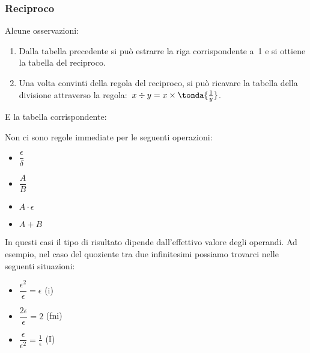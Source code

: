 \subsubsection{Reciproco}
\label{subsec:insnum_reciproco}

\noindent \begin{minipage}{.5\textwidth}
Alcune osservazioni:
\begin{enumerate} [noitemsep]
 \item Dalla tabella precedente si può estrarre la riga corrispondente a~1
e si ottiene la tabella del reciproco.
 \item Una volta convinti della regola del reciproco, si può ricavare la 
tabella della divisione attraverso la 
regola:~$x \div y = x \times \tonda{\frac{1}{y}}$.
\end{enumerate}
\end{minipage}
\hfill
\begin{minipage}{.45\textwidth}
E la tabella corrispondente:
\begin{center}
\renewcommand{\arraystretch}{.0}
\end{center}
\vspace{11mm}
\end{minipage}

\begin{osservazione}
Non ci sono regole immediate per le seguenti operazioni:
\begin{multicols}{4}
\begin{itemize} [nosep]
 \item \(\dfrac{\epsilon}{\delta}\)
 \item \(\dfrac{A}{B}\)
 \item \(A \cdot \epsilon\)
 \item \(A + B\)
\end{itemize}
\end{multicols}
In questi casi il tipo di risultato dipende dall'effettivo valore degli 
operandi. Ad esempio, nel caso del quoziente tra due infinitesimi possiamo 
trovarci nelle seguenti situazioni:
\begin{multicols}{3}
\begin{itemize} [nosep]
 \item \(\dfrac{\epsilon^2}{\epsilon} = \epsilon\) \quad (i)
 \item \(\dfrac{2\epsilon}{\epsilon} = 2\) \quad (fni)
 \item \(\dfrac{\epsilon}{\epsilon^2} = \frac{1}{\epsilon}\) \quad (I)
\end{itemize}
\end{multicols}
\end{osservazione}

